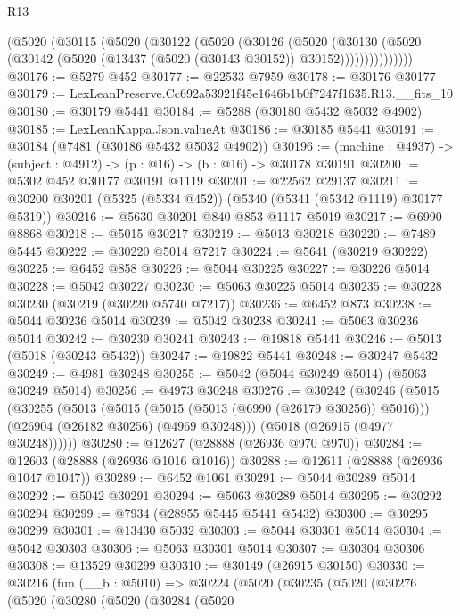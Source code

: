 \begin{lexlean}{R13}
\begin{coremodule}
          (@5020
            (@30115
              (@5020
                (@30122
                  (@5020
                    (@30126
                      (@5020
                        (@30130
                          (@5020
                            (@30142 (@5020 (@13437 (@5020 (@30143 @30152)) @30152)))))))))))))))
@30176 := @5279 @452
@30177 := @22533 @7959
@30178 := @30176 @30177
@30179 := LexLeanPreserve.Cc692a53921f45e1646b1b0f7247f1635.R13.__fits_10
@30180 := @30179 @5441
@30184 := @5288 (@30180 @5432 @5032 @4902)
@30185 := LexLeanKappa.Json.valueAt
@30186 := @30185 @5441
@30191 := @30184 (@7481 (@30186 @5432 @5032 @4902))
@30196 := (machine : @4937) -> (subject : @4912) -> (p : @16) -> (b : @16) -> @30178 @30191
@30200 := @5302 @452 @30177 @30191 @1119
@30201 := @22562 @29137
@30211 := @30200 @30201 (@5325 (@5334 @452)) (@5340 (@5341 (@5342 @1119) @30177 @5319))
@30216 := @5630 @30201 @840 @853 @1117 @5019
@30217 := @6990 @8868
@30218 := @5015 @30217
@30219 := @5013 @30218
@30220 := @7489 @5445
@30222 := @30220 @5014 @7217
@30224 := @5641 (@30219 @30222)
@30225 := @6452 @858
@30226 := @5044 @30225
@30227 := @30226 @5014
@30228 := @5042 @30227
@30230 := @5063 @30225 @5014
@30235 := @30228 @30230 (@30219 (@30220 @5740 @7217))
@30236 := @6452 @873
@30238 := @5044 @30236 @5014
@30239 := @5042 @30238
@30241 := @5063 @30236 @5014
@30242 := @30239 @30241
@30243 := @19818 @5441
@30246 := @5013 (@5018 (@30243 @5432))
@30247 := @19822 @5441
@30248 := @30247 @5432
@30249 := @4981 @30248
@30255 := @5042 (@5044 @30249 @5014) (@5063 @30249 @5014)
@30256 := @4973 @30248
@30276 := @30242
    (@30246
      (@5015
        (@30255
          (@5013
            (@5015 (@5015 (@5013 (@6990 (@26179 @30256)) @5016)))
            (@26904 (@26182 @30256) (@4969 @30248)))
          (@5018 (@26915 (@4977 @30248))))))
@30280 := @12627 (@28888 (@26936 @970 @970))
@30284 := @12603 (@28888 (@26936 @1016 @1016))
@30288 := @12611 (@28888 (@26936 @1047 @1047))
@30289 := @6452 @1061
@30291 := @5044 @30289 @5014
@30292 := @5042 @30291
@30294 := @5063 @30289 @5014
@30295 := @30292 @30294
@30299 := @7934 (@28955 @5445 @5441 @5432)
@30300 := @30295 @30299
@30301 := @13430 @5032
@30303 := @5044 @30301 @5014
@30304 := @5042 @30303
@30306 := @5063 @30301 @5014
@30307 := @30304 @30306
@30308 := @13529 @30299
@30310 := @30149 (@26915 @30150)
@30330 := @30216
    (fun (__b : @5010) =>
    @30224
      (@5020
        (@30235
          (@5020
            (@30276
              (@5020
                (@30280
                  (@5020
                    (@30284
                      (@5020

\end{coremodule}
\end{lexlean}
